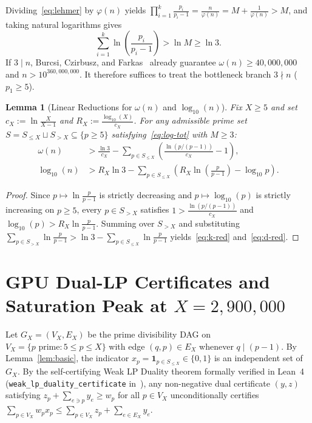 \documentclass[11pt]{amsart}
\newtheorem{lemma}[theorem]{Lemma}
\theoremstyle{remark}
\numberwithin{equation}{section}
\begin{document}
Dividing~\eqref{eq:lehmer} by $\varphi(n)$ yields $\prod_{i=1}^k \frac{p_i}{p_i - 1} = \frac{n}{\varphi(n)} = M + \frac{1}{\varphi(n)} > M$, and taking natural logarithms gives
\begin{equation}\label{eq:log-tot}
    \sum_{i=1}^k \ln\!\left(\frac{p_i}{p_i - 1}\right) > \ln M \ge \ln 3.
\end{equation}
If $3 \mid n$, Burcsi, Czirbusz, and Farkas~\cite{BCF2011} already guarantee $\omega(n) \ge 40{,}000{,}000$ and $n > 10^{360{,}000{,}000}$. It therefore suffices to treat the bottleneck branch $3 \nmid n$ ($p_1 \ge 5$).

\begin{lemma}[Linear Reductions for $\omega(n)$ and $\log_{10}(n)$]\label{lem:red}
Fix $X \ge 5$ and set $c_X := \ln\frac{X}{X - 1}$ and $R_X := \frac{\log_{10}(X)}{c_X}$. For any admissible prime set $S = S_{\le X} \sqcup S_{> X} \subseteq \{p \ge 5\}$ satisfying~\eqref{eq:log-tot} with $M \ge 3$:
\begin{align}
    \omega(n) &> \frac{\ln 3}{c_X} - \sum_{p \in S_{\le X}} \left(\frac{\ln(p/(p-1))}{c_X} - 1\right), \label{eq:k-red} \\
    \log_{10}(n) &> R_X \ln 3 - \sum_{p \in S_{\le X}} \left(R_X \ln\!\left(\frac{p}{p-1}\right) - \log_{10} p\right). \label{eq:d-red}
\end{align}
\end{lemma}

\begin{proof}
Since $p \mapsto \ln\frac{p}{p-1}$ is strictly decreasing and $p \mapsto \log_{10}(p)$ is strictly increasing on $p \ge 5$, every $p \in S_{> X}$ satisfies $1 > \frac{\ln(p/(p-1))}{c_X}$ and $\log_{10}(p) > R_X \ln\frac{p}{p-1}$. Summing over $S_{> X}$ and substituting $\sum_{p \in S_{> X}} \ln\frac{p}{p-1} > \ln 3 - \sum_{p \in S_{\le X}} \ln\frac{p}{p-1}$ yields~\eqref{eq:k-red} and~\eqref{eq:d-red}.
\end{proof}

\section{GPU Dual-LP Certificates and Saturation Peak at $X = 2{,}900{,}000$}

Let $G_X = (V_X, E_X)$ be the prime divisibility DAG on $V_X = \{p \text{ prime} : 5 \le p \le X\}$ with edge $(q, p) \in E_X$ whenever $q \mid (p - 1)$. By Lemma~\ref{lem:basic}, the indicator $x_p = \mathbf{1}_{p \in S_{\le X}} \in \{0, 1\}$ is an independent set of $G_X$. By the self-certifying Weak LP Duality theorem formally verified in Lean~4 (\texttt{weak\_lp\_duality\_certificate} in~\cite{BarmaseNeon2026}), any non-negative dual certificate $(y, z)$ satisfying $z_p + \sum_{e \ni p} y_e \ge w_p$ for all $p \in V_X$ unconditionally certifies $\sum_{p \in V_X} w_p x_p \le \sum_{p \in V_X} z_p + \sum_{e \in E_X} y_e$.
\end{document}
